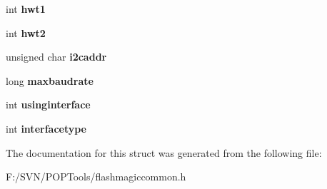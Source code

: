 \begin{DoxyCompactItemize}
\item 
\hypertarget{structfm__connectoptions__com_a5f696ffc30512bf42c1febeb51d7f141}{int {\bfseries hwt1}}\label{structfm__connectoptions__com_a5f696ffc30512bf42c1febeb51d7f141}

\item 
\hypertarget{structfm__connectoptions__com_a3f80652eeca3d52e8d43560df9a85e27}{int {\bfseries hwt2}}\label{structfm__connectoptions__com_a3f80652eeca3d52e8d43560df9a85e27}

\item 
\hypertarget{structfm__connectoptions__com_a996217a59f2a6d1c0c3face3db4a73fd}{unsigned char {\bfseries i2caddr}}\label{structfm__connectoptions__com_a996217a59f2a6d1c0c3face3db4a73fd}

\item 
\hypertarget{structfm__connectoptions__com_afa88fe0975a941d9b252f3f27bc83cd1}{long {\bfseries maxbaudrate}}\label{structfm__connectoptions__com_afa88fe0975a941d9b252f3f27bc83cd1}

\item 
\hypertarget{structfm__connectoptions__com_a7bd912a3acca21681b9514928e29e3fc}{int {\bfseries usinginterface}}\label{structfm__connectoptions__com_a7bd912a3acca21681b9514928e29e3fc}

\item 
\hypertarget{structfm__connectoptions__com_a39cb5d63f9c8cf2bfce6f030f847eefb}{int {\bfseries interfacetype}}\label{structfm__connectoptions__com_a39cb5d63f9c8cf2bfce6f030f847eefb}

\end{DoxyCompactItemize}


The documentation for this struct was generated from the following file\-:\begin{DoxyCompactItemize}
\item 
F\-:/\-S\-V\-N/\-P\-O\-P\-Tools/flashmagiccommon.\-h\end{DoxyCompactItemize}
